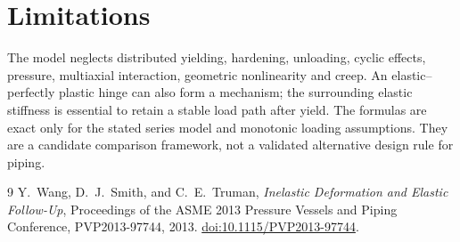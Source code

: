 \documentclass[11pt,a4paper]{article}
\begin{document}
\section{Limitations}

The model neglects distributed yielding, hardening, unloading, cyclic effects, pressure, multiaxial interaction, geometric nonlinearity and creep. An elastic--perfectly plastic hinge can also form a mechanism; the surrounding elastic stiffness is essential to retain a stable load path after yield. The formulas are exact only for the stated series model and monotonic loading assumptions. They are a candidate comparison framework, not a validated alternative design rule for piping.

\begin{thebibliography}{9}
Y.~Wang, D.~J.~Smith, and C.~E.~Truman,
\emph{Inelastic Deformation and Elastic Follow-Up},
Proceedings of the ASME 2013 Pressure Vessels and Piping Conference,
PVP2013-97744, 2013.
\href{https://doi.org/10.1115/PVP2013-97744}
{doi:10.1115/PVP2013-97744}.
\end{thebibliography}
\end{document}

